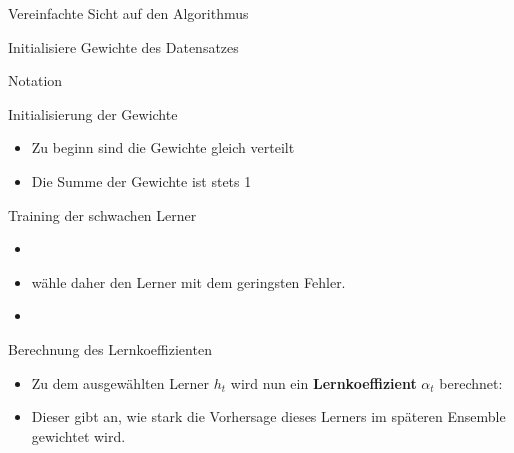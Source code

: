 \documentclass[hyperref={bookmarks=false},11pt,dvipsnames]{beamer}
\begin{document}
\begin{frame}{Vereinfachte Sicht auf den Algorithmus}
	\begin{algorithm}[H]
		\DontPrintSemicolon
		\BlankLine
		Initialisiere Gewichte des Datensatzes\;
	\end{algorithm}
\end{frame}

\begin{frame}[t]{Notation}
	
\end{frame}

\begin{frame}[t]{Initialisierung der Gewichte}
	\begin{itemize}
		\item <1-> Zu beginn sind die Gewichte gleich verteilt 
		\item <2-> Die Summe der Gewichte ist stets 1 
	\end{itemize}
\end{frame}

\begin{frame}[t]{Training der schwachen Lerner}
	\begin{itemize}
		\item <1-> 
		\item <2->  wähle daher den Lerner mit dem geringsten Fehler.
		\item <3-> 
	\end{itemize}

\end{frame}

\begin{frame}[t]{Berechnung des Lernkoeffizienten}
	\begin{itemize}
		\item <1-> Zu dem ausgewählten Lerner $h_t$ wird nun ein \textbf{Lernkoeffizient} $\alpha_t$ berechnet:
		      
		\item <2-> Dieser gibt an, wie stark die Vorhersage dieses Lerners im späteren Ensemble gewichtet wird.
	\end{itemize}
\end{frame}
\end{document}

